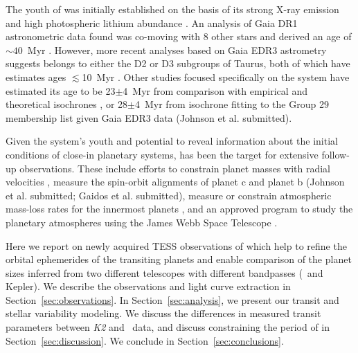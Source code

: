 \documentclass[twocolumn]{aastex631}
\begin{document}
The youth of \sname was initially established on the basis of its strong X-ray emission \citep{Wichmann1996} and high photospheric lithium abundance \citep{Wichmann2000}. An analysis of Gaia DR1 astronometric data found \sname was co-moving with 8 other stars \citep[Group 29;]{Oh2017} and derived an age of $\sim 40$~Myr \citep{Luhman2018}. However, more recent analyses based on Gaia EDR3 astrometry suggests \sname belongs to either the D2 or D3 subgroups of Taurus, both of which have estimates ages $\lesssim$10~Myr \citep[][Gaidos et al. submitted]{Krolikowski2021}. Other studies focused specifically on the \sname system have estimated its age to be 23$\pm$4~Myr from comparison with empirical and theoretical isochrones \citep{David2019b}, or 28$\pm$4~Myr from isochrone fitting to the \citet{Luhman2018} Group 29 membership list given Gaia EDR3 data (Johnson et al. submitted).


Given the system's youth and potential to reveal information about the initial conditions of close-in planetary systems, \sname has been the target for extensive follow-up observations. These include efforts to constrain planet masses with radial velocities \citep{Beichman2019}, measure the spin-orbit alignments of planet c \citep{Feinstein21} and planet b (Johnson et al. submitted; Gaidos et al. submitted), measure or constrain atmospheric mass-loss rates for the innermost planets \citep{Schlawin21, Vissapragada21}, and an approved program to study the planetary atmospheres using the James Webb Space Telescope \citep{Desert2021}.


Here we report on newly acquired TESS observations of \sname which help to refine the orbital ephemerides of the transiting planets and enable comparison of the planet sizes inferred from two different telescopes with different bandpasses (\tess\ and Kepler). We describe the observations and light curve extraction in Section~\ref{sec:observations}. In Section~\ref{sec:analysis}, we present our transit and stellar variability modeling. We discuss the differences in measured transit parameters between \textit{K2} and \tess\ data, and discuss constraining the period of \planete in Section~\ref{sec:discussion}. We conclude in Section~\ref{sec:conclusions}.
\end{document}
